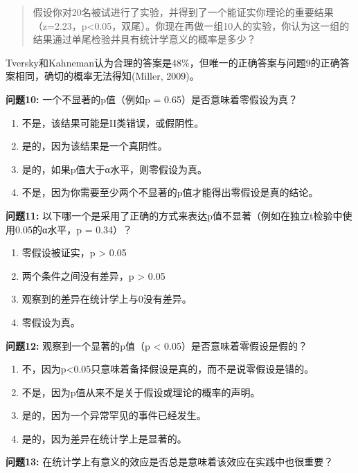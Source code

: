 \documentclass[
  letterpaper,
  DIV=11,
  numbers=noendperiod]{scrreprt}
\providecommand{\tightlist}{%
  \setlength{\itemsep}{0pt}\setlength{\parskip}{0pt}}\usepackage{longtable,booktabs,array}
\begin{document}
\begin{quote}
假设你对20名被试进行了实验，并得到了一个能证实你理论的重要结果（z=2.23，p\textless0.05，双尾）。你现在再做一组10人的实验，你认为这一组的结果通过单尾检验并具有统计学意义的概率是多少？
\end{quote}

Tversky和Kahneman认为合理的答案是48\%，但唯一的正确答案与问题9的正确答案相同，确切的概率无法得知(Miller,
2009)。

\textbf{问题10:} 一个不显著的p值（例如p = 0.65）是否意味着零假设为真？

\begin{enumerate}
\def\labelenumi{\Alph{enumi})}
\tightlist
\item
  不是，该结果可能是II类错误，或假阴性。
\item
  是的，因为该结果是一个真阴性。
\item
  是的，如果p值大于α水平，则零假设为真。
\item
  不是，因为你需要至少两个不显著的p值才能得出零假设是真的结论。
\end{enumerate}

\textbf{问题11:}
以下哪一个是采用了正确的方式来表达p值不显著（例如在独立t检验中使用0.05的α水平，p
= 0.34）？

\begin{enumerate}
\def\labelenumi{\Alph{enumi})}
\tightlist
\item
  零假设被证实，p \textgreater{} 0.05
\item
  两个条件之间没有差异，p \textgreater{} 0.05
\item
  观察到的差异在统计学上与0没有差异。
\item
  零假设为真。
\end{enumerate}

\textbf{问题12:} 观察到一个显著的p值（p \textless{}
0.05）是否意味着零假设是假的？

\begin{enumerate}
\def\labelenumi{\Alph{enumi})}
\tightlist
\item
  不，因为p\textless0.05只意味着备择假设是真的，而不是说零假设是错的。
\item
  不是，因为p值从来不是关于假设或理论的概率的声明。
\item
  是的，因为一个异常罕见的事件已经发生。
\item
  是的，因为差异在统计学上是显著的。
\end{enumerate}

\textbf{问题13:}
在统计学上有意义的效应是否总是意味着该效应在实践中也很重要？
\end{document}
